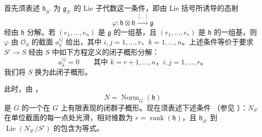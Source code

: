 首先须表述 \(\mathfrak h_{S'}\) 为 \(\mathfrak g_{S'}\) 的 Lie 子代数这一条件，即由 Lie 括号所诱导的态射
\[
  \varphi\colon
  \mathfrak h\otimes\mathfrak h
  \xrightarrow{[\, ,\,]}
  \mathfrak g
\]
经由 \(\mathfrak h\) 分解。若 \((e_1,\ldots,e_n)\) 是 \(\mathfrak g\) 的一组基，且 \((e_1,\ldots,e_r)\) 是 \(\mathfrak h\) 的一组基，则 \(\varphi\) 由 \(\mathcal O_S\) 的截面 \(a_k^{ij}\) 给出，其中 \(i,j=1,\ldots,r\)、\(k=1,\ldots,n\)。上述条件等价于要求 \(S'\to S\) 经由 \(S\) 中如下方程定义的闭子概形分解：
\[
  a_k^{ij}=0
  \qquad
  \text{其中 \(k=r+1,\ldots,n\)，\(i,j=1,\ldots,r\)。}
\]
我们将 \(S\) 换为此闭子概形。

此时，由 ，
\[
  N=\underline{\operatorname{Norm}}_G(\mathfrak h)
\]
是 \(G\) 的一个在 \(G\) 上有限表现的闭群子概形。现在须表述下述条件 \textup{（参见 ）}：\(N_{S'}\) 在单位截面的每一点处光滑，相对维数为 \(r=\operatorname{rank}(\mathfrak h)\)，且 \(\mathfrak h_{S'}\) 到 \(\operatorname{Lie}(N_{S'}/S')\) 的包含为等式。

